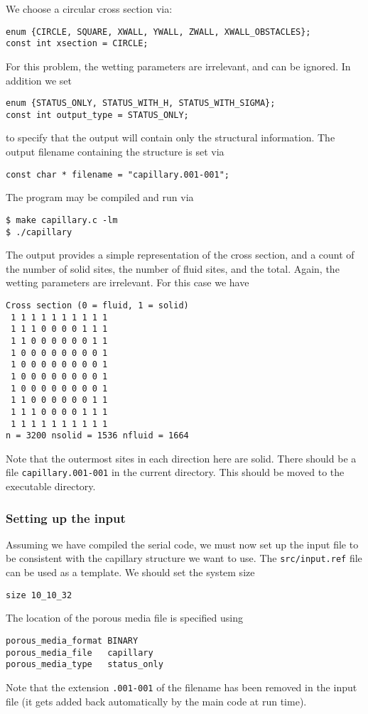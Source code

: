 We choose a circular cross section via:
\begin{lstlisting}
enum {CIRCLE, SQUARE, XWALL, YWALL, ZWALL, XWALL_OBSTACLES};
const int xsection = CIRCLE;
\end{lstlisting}
For this problem, the wetting parameters are irrelevant, and can be
ignored. In addition we set
\begin{lstlisting}
enum {STATUS_ONLY, STATUS_WITH_H, STATUS_WITH_SIGMA};
const int output_type = STATUS_ONLY;
\end{lstlisting}
to specify that the output will contain only the structural information.
The output filename containing the structure is set via
\begin{lstlisting}
const char * filename = "capillary.001-001";
\end{lstlisting}

The program may be compiled and run via
\begin{lstlisting}
$ make capillary.c -lm
$ ./capillary
\end{lstlisting}
The output provides a simple representation of the cross section,
and a count of the number of solid sites, the number of fluid sites,
and the total. Again, the wetting parameters are irrelevant. For this
case we have
\begin{lstlisting}
Cross section (0 = fluid, 1 = solid)
 1 1 1 1 1 1 1 1 1 1
 1 1 1 0 0 0 0 1 1 1
 1 1 0 0 0 0 0 0 1 1
 1 0 0 0 0 0 0 0 0 1
 1 0 0 0 0 0 0 0 0 1
 1 0 0 0 0 0 0 0 0 1
 1 0 0 0 0 0 0 0 0 1
 1 1 0 0 0 0 0 0 1 1
 1 1 1 0 0 0 0 1 1 1
 1 1 1 1 1 1 1 1 1 1
n = 3200 nsolid = 1536 nfluid = 1664
\end{lstlisting}
Note that the outermost sites in each direction here are solid. There
should be a file \texttt{capillary.001-001} in the current directory.
This should be moved to the executable directory.


\subsubsection{Setting up the input}

Assuming we have compiled the serial code, we must now set up the
input file to be consistent with the capillary structure we want
to use. The \texttt{src/input.ref} file can be used as a template.
We should set the system size
\begin{lstlisting}
size 10_10_32
\end{lstlisting}
The location of the porous media file is specified using
\begin{lstlisting}
porous_media_format BINARY
porous_media_file   capillary
porous_media_type   status_only
\end{lstlisting}
Note that the extension \texttt{.001-001} of the filename has been
removed in the input file (it gets added back automatically by the
main code at run time).

